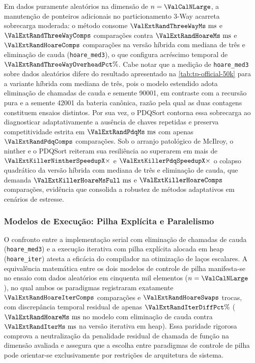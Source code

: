 \documentclass[12pt]{article}
\begin{document}
Em dados puramente aleatórios na dimensão de $n = \ValCalNLarge$, a manutenção de ponteiros adicionais no particionamento 3-Way acarreta sobrecarga moderada: o método consome $\ValExtRandThreeWayMs\text{ ms}$ e $\ValExtRandThreeWayComps$ comparações contra $\ValExtRandHoareMs\text{ ms}$ e $\ValExtRandHoareComps$ comparações na versão híbrida com mediana de três e eliminação de cauda (\texttt{hoare\_med3}), o que configura acréscimo temporal de $\ValExtRandThreeWayOverheadPct\%$. Cabe notar que a medição de \texttt{hoare\_med3} sobre dados aleatórios difere do resultado apresentado na \cref{tab:tp-official-50k} para a variante híbrida com mediana de três, pois o modelo estendido adota eliminação de chamadas de cauda e semente 90001, em contraste com a recursão pura e a semente 42001 da bateria canônica, razão pela qual as duas contagens constituem ensaios distintos. Por sua vez, o PDQSort contorna essa sobrecarga ao diagnosticar adaptativamente a ausência de chaves repetidas e preserva competitividade estrita em $\ValExtRandPdqMs\text{ ms}$ com apenas $\ValExtRandPdqComps$ comparações. Sob o arranjo patológico de McIlroy, o ninther e o PDQSort reiteram sua resiliência ao superarem em mais de $\ValExtKillerNintherSpeedupX\times$ e $\ValExtKillerPdqSpeedupX\times$ o colapso quadrático da versão híbrida com mediana de três e eliminação de cauda, que demanda $\ValExtKillerHoareMsFull\text{ ms}$ e $\ValExtKillerHoareComps$ comparações, evidência que consolida a robustez de métodos adaptativos em cenários de estresse.

\subsubsection{Modelos de Execução: Pilha Explícita e Paralelismo}\label{sec:res-execucao}

O confronto entre a implementação serial com eliminação de chamadas de cauda (\texttt{hoare\_med3}) e a execução iterativa com pilha explícita alocada em heap (\texttt{hoare\_iter}) atesta a eficácia do compilador na otimização de laços escalares. A equivalência matemática entre os dois modelos de controle de pilha manifesta-se no ensaio com dados aleatórios em cinquenta mil elementos ($n = \ValCalNLarge$), no qual ambos os paradigmas registraram exatamente $\ValExtRandHoareIterComps$ comparações e $\ValExtRandHoareSwaps$ trocas, com discrepância temporal residual de apenas $\ValExtRandIterDiffPct\%$ ($\ValExtRandHoareMs\text{ ms}$ no modelo com eliminação de cauda contra $\ValExtRandIterMs\text{ ms}$ na versão iterativa em heap). Essa paridade rigorosa comprova a neutralização da penalidade residual de chamada de função na dimensão avaliada e assegura que a escolha entre paradigmas de controle de pilha pode orientar-se exclusivamente por restrições de arquitetura de sistema.
\end{document}

